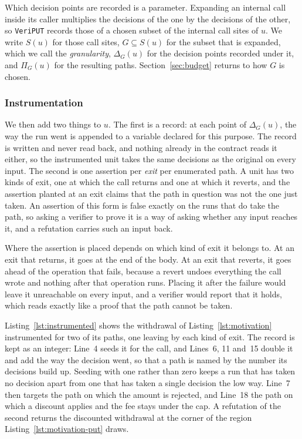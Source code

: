 \documentclass[manuscript,anonymous]{acmart}
\newcommand{\tool}[1]{\texttt{#1}}
\begin{document}
Which decision points are recorded is a parameter. Expanding an internal call
inside its caller multiplies the decisions of the one by the decisions of the
other, so \tool{VeriPUT} records those of a chosen subset of the internal call
sites of $u$. We write $S(u)$ for those call sites, $G \subseteq S(u)$ for the
subset that is expanded, which we call the \emph{granularity}, $\Delta_G(u)$ for
the decision points recorded under it, and $\Pi_G(u)$ for the resulting paths.
Section~\ref{sec:budget} returns to how $G$ is chosen.

\subsubsection{Instrumentation}
We then add two things to $u$. The first is a record: at each point of
$\Delta_G(u)$, the way the run went is appended to a variable declared for this
purpose. The record is written and never read back, and nothing already in the
contract reads it either, so the instrumented unit takes the same decisions as
the original on every input. The second is one assertion per \emph{exit} per
enumerated path. A unit has two kinds of exit, one at which the call returns and
one at which it reverts, and the assertion planted at an exit claims that the
path in question was not the one just taken. An assertion of this form is false
exactly on the runs that do take the path, so asking a verifier to prove it is a
way of asking whether any input reaches it, and a refutation carries such an
input back.

Where the assertion is placed depends on which kind of exit it belongs to. At an
exit that returns, it goes at the end of the body. At an exit that reverts, it
goes ahead of the operation that fails, because a revert undoes everything the
call wrote and nothing after that operation runs. Placing it after the failure
would leave it unreachable on every input, and a verifier would report that it
holds, which reads exactly like a proof that the path cannot be taken.

Listing~\ref{lst:instrumented} shows the withdrawal of
Listing~\ref{lst:motivation} instrumented for two of its paths, one leaving by
each kind of exit. The record is kept as an integer: Line~4 seeds it for the
call, and Lines~6, 11 and~15 double it and add the way the decision went, so
that a path is named by the number its decisions build up. Seeding with one
rather than zero keeps a run that has taken no decision apart from one that has
taken a single decision the low way. Line~7 then targets the path on which the
amount is rejected, and Line~18 the path on which a discount applies and the fee
stays under the cap. A refutation of the second returns the discounted
withdrawal at the corner of the region Listing~\ref{lst:motivation-put} draws.
\end{document}
